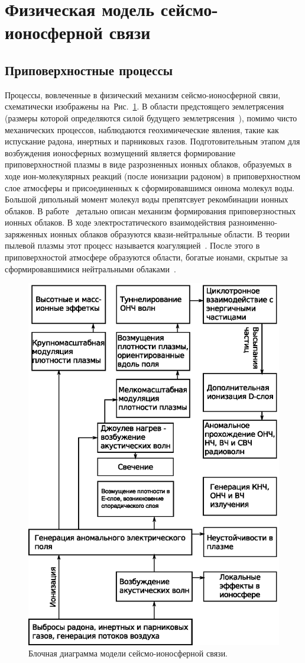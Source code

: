 \documentclass[12pt, oneside, a4paper]{article}
\begin{document}
\section{Физическая модель сейсмо-ионосферной связи}
\subsection{Приповерхностные процессы}
Процессы, вовлеченные в физический механизм сейсмо-ионосферной связи, схематически изображены на~\mbox{Рис. \ref{fig:process-chain}}. В области  предстоящего землетрясения (размеры которой определяются силой будущего землетрясения~\cite{Pulinets:2004a}), помимо чисто механических процессов, наблюдаются геохимичеческие явления, такие как испускание радона, инертных и парниковых газов. Подготовительным этапом для возбуждения ионосферных возмущений является формирование приповерхностной плазмы в виде разрозненных ионных облаков, образуемых в ходе ион-молекулярных реакций (после ионизации радоном) в приповерхностном слое атмосферы и присоединенных к сформировавшимся оинома молекул воды. Большой дипольный момент молекул воды препятсвует рекомбинации ионных облаков. В работе~\cite{Pulinets_Boyarchuk:2004} детально описан механизм формирования приповерзностных ионных облаков. В ходе электростатического взаимодействия разноименно-заряженных ионных облаков образуются квази-нейтральные области. В теории пылевой плазмы этот процесс называется коагуляцией~\cite{Horanyi_Goertz:1990}. После этого в приповерхностой атмосфере образуются области, богатые ионами, скрытые за сформировавшимися нейтральными облаками~\cite{Pulinets:2002a}.
\begin{figure}[H]
    \centering
    \includegraphics*[width=0.8\columnwidth]{process-chain}
    \caption{Блочная диаграмма модели сейсмо-ионосферной связи.}
    \label{fig:process-chain}
\end{figure}
\end{document}
